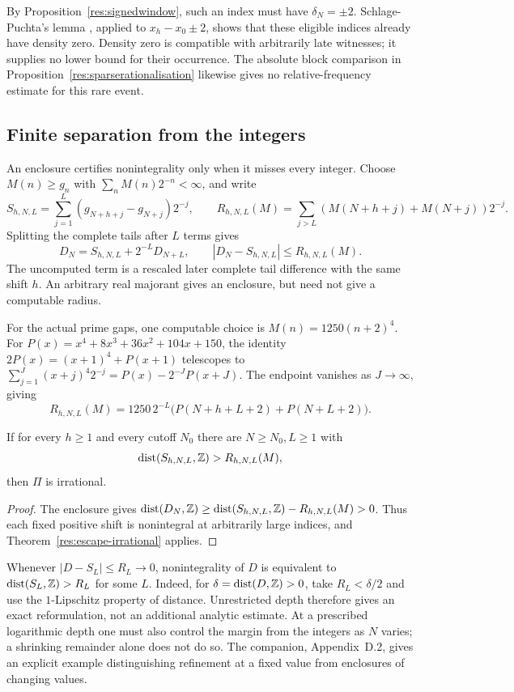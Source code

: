 \documentclass[11pt]{article}
\begin{document}
By Proposition~\ref{res:signedwindow}, such an index must have
$\delta_N=\pm2$.  Schlage-Puchta's lemma
\cite[Lemma~4]{schlagepuchta2011}, applied to $x_h-x_0\pm2$, shows that
these eligible indices already have density zero.  Density zero is
compatible with arbitrarily late witnesses; it supplies no lower bound
for their occurrence.  The absolute block comparison in
Proposition~\ref{res:sparserationalisation} likewise gives no
relative-frequency estimate for this rare event.

\subsection{Finite separation from the integers}
An enclosure certifies nonintegrality only when it misses every integer.
Choose $M(n)\ge g_n$ with
$\sum_nM(n)2^{-n}<\infty$, and write
\[
 S_{h,N,L}=\sum_{j=1}^L(g_{N+h+j}-g_{N+j})2^{-j},\qquad
 R_{h,N,L}(M)=\sum_{j>L}(M(N+h+j)+M(N+j))2^{-j}.
\]
Splitting the complete tails after $L$ terms gives
\[
 D_N=S_{h,N,L}+2^{-L}D_{N+L},\qquad
 |D_N-S_{h,N,L}|\le R_{h,N,L}(M).
\]
The uncomputed term is a rescaled later complete tail difference with
the same shift $h$.  An arbitrary real majorant gives an enclosure,
but need not give a computable radius.

For the actual prime gaps, one computable choice is $M(n)=1250(n+2)^4$.
For $P(x)=x^4+8x^3+36x^2+104x+150$, the identity
$2P(x)=(x+1)^4+P(x+1)$ telescopes to
$\sum_{j=1}^{J}(x+j)^4 2^{-j}=P(x)-2^{-J}P(x+J)$.
The endpoint vanishes as $J\to\infty$, giving
\[
 R_{h,N,L}(M)=1250\,2^{-L}
             \bigl(P(N+h+L+2)+P(N+L+2)\bigr).
\]

\begin{proposition}\label{res:truncation}
If for every $h\ge1$ and every cutoff $N_0$ there are $N\ge N_0,L\ge1$ with
\begin{equation}\label{eq:truncation}
 \operatorname{dist}(S_{h,N,L},\Z)>R_{h,N,L}(M),
\end{equation}
then $\Pi$ is irrational.
\end{proposition}
\begin{proof}
The enclosure gives
$\operatorname{dist}(D_N,\mathbb{Z})\ge
\operatorname{dist}(S_{h,N,L},\mathbb{Z})-R_{h,N,L}(M)>0$.
Thus each fixed positive shift is nonintegral at arbitrarily large
indices, and Theorem~\ref{res:escape-irrational} applies.
\end{proof}

\begin{remark}\label{res:complete-truncation}
Whenever $|D-S_L|\le R_L\to0$, nonintegrality of $D$ is equivalent to
$\operatorname{dist}(S_L,\mathbb{Z})>R_L$ for some $L$.  Indeed, for
$\delta=\operatorname{dist}(D,\mathbb{Z})>0$, take $R_L<\delta/2$ and use the
$1$-Lipschitz property of distance.  Unrestricted depth therefore gives
an exact reformulation, not an additional analytic estimate.  At a
prescribed logarithmic depth one must also control the margin from the
integers as $N$ varies; a shrinking remainder alone does not do so.
The companion, Appendix~D.2, gives an explicit example distinguishing
refinement at a fixed value from enclosures of changing values.
\end{remark}
\end{document}
